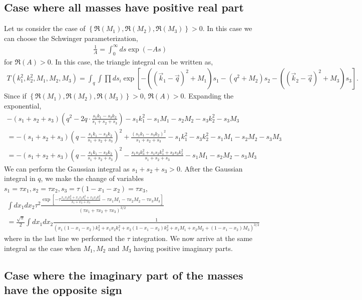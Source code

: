 \documentclass[twoside]{article}
\begin{document}
\subsection{Case where all masses have positive real part}
Let us consider the case of $\left\{ \Re(M_1),\Re(M_2),\Re(M_3) \right\} > 0$. In this case we can choose the Schwinger parameterization,
\begin{align}
  \frac{1}{A} = \int^{\infty}_0ds \exp(-As)
\end{align}
for $\Re(A)>0$. In this case, the triangle integral can be written as,
\begin{align}
  T(k^2_1,k^2_2,M_1,M_2,M_3) = \int_{q}\int \prod ds_i \exp\left[ -\left((\vec{k}_1 - \vec{q})^2 + M_1\right)s_1 - (q^2 + M_2)s_2 - \left(
  (\vec{k}_2 - \vec{q})^2 + M_3 \right)s_3 \right].
\end{align}
Since if $\left\{ \Re(M_1),\Re(M_2),\Re(M_3) \right\}> 0$, $\Re(A)>0$. Expanding the exponential,
\begin{align}
  -(s_1 + s_2 + s_3)\left( q^2 - 2q\cdot\frac{s_1k_1 - s_3k_2}{s_1 + s_2 + s_3} \right) - s_1k^2_1 - s_1M_1 - s_2M_2 - s_3k^2_2 - s_3M_3\\
  = -(s_1 + s_2 + s_3)\left(q - \frac{s_1k_1 - s_3k_2}{s_1 + s_2 + s_3}\right)^2 + \frac{(s_1k_1 - s_3k_2)^2}{s_1 + s_2 + s_3} -s_1k^2_1 - s_3k^2_2 -
  s_1M_1 - s_2M_2 - s_3M_3\\
  = -(s_1 + s_2 + s_3)\left( q - \frac{s_1k_1 - s_3k_2}{s_1 + s_2 + s_3} \right)^2 - \frac{s_1s_3k^2_3 + s_1s_2k^2_1 +
  s_2s_3k^2_2}{s_1 + s_2 + s_3} - s_1M_1 - s_2M_2 - s_3M_3
\end{align}
We can perform the Gaussian integral as $s_1 + s_2 + s_3 > 0$. After the Gaussian integral in $q$, we make the change of variables $s_1 = \tau x_1, s_2 = \tau x_2, s_3 = \tau(1 - x_1 - x_2) = \tau x_3$,
\begin{align}
  \int dx_1dx_2\tau^2\frac{\exp\left[ -\tau\frac{x_1x_3k^2_3 + x_1x_2k^2_1 + x_2x_3k^2_2}{x_1 + x_2 + x_3} - \tau x_1M_1 - \tau x_2M_2 - \tau x_3M_3
  \right]}{(\tau x_1 + \tau x_2 + \tau x_3)^{3/2}}\\
  = \frac{\sqrt{\pi}}{2}\int dx_1dx_2 \frac{1}{\left(x_1(1 - x_1 - x_2)k^2_3 + x_1x_2k^2_1 + x_2(1 - x_1 - x_2)k^2_2 + x_1M_1 + x_2M_2 +
  (1 - x_1 - x_2)M_3\right)^{3/2}}
\end{align}
where in the last line we performed the $\tau$ integration. We now arrive at the same integral as the case when $M_1, M_2$ and $M_3$ having
positive imaginary parts.

\subsection{Case where the imaginary part of the masses have the opposite sign}
\end{document}
